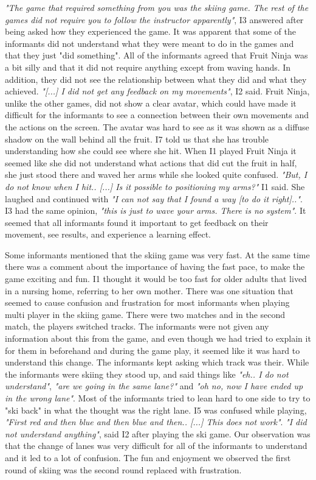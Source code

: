 \emph{"The game that required something from you was the skiing game. The rest of the games did not require you to follow the instructor apparently"}, I3 answered after being asked how they experienced the game. It was apparent that some of the informants did not understand what they were meant to do in the games and that they just "did something". All of the informants agreed that Fruit Ninja was a bit silly and that it did not require anything except from waving hands. In addition, they did not see the relationship between what they did and what they achieved. \emph{"[...] I did not get any feedback on my movements"}, I2 said. Fruit Ninja, unlike the other games, did not show a clear avatar, which could have made it difficult for the informants to see a connection between their own movements and the actions on the screen. The avatar was hard to see as it was shown as a diffuse shadow on the wall behind all the fruit. I7 told us that she has trouble understanding how she could see where she hit. When I1 played Fruit Ninja it seemed like she did not understand what actions that did cut the fruit in half, she just stood there and waved her arms while she looked quite confused. \emph{"But, I do not know when I hit.. [...] Is it possible to positioning my arms?"} I1 said. She laughed and continued with \emph{"I can not say that I found a way [to do it right].."}. I3 had the same opinion, \emph{"this is just to wave your arms. There is no system"}. It seemed that all informants found it important to get feedback on their movement, see results, and experience a learning effect. 

Some informants mentioned that the skiing game was very fast. At the same time there was a comment about the importance of having the fast pace, to make the game exciting and fun. I1 thought it would be too fast for older adults that lived in a nursing home, referring to her own mother. There was one situation that seemed to cause confusion and frustration for most informants when playing multi player in the skiing game. There were two matches and in the second match, the players switched tracks. The informants were not given any information about this from the game, and even though we had tried to explain it for them in beforehand and during the game play, it seemed like it was hard to understand this change. The informants kept asking which track was their. While the informants were skiing they stood up, and said things like \emph{"eh.. I do not understand"}, \emph{"are we going in the same lane?"} and \emph{"oh no, now I have ended up in the wrong lane"}. Most of the informants tried to lean hard to one side to try to "ski back" in what the thought was the right lane. I5 was confused while playing, \emph{"First red and then blue and then blue and then.. [...] This does not work"}. \emph{"I did not understand anything"}, said I2 after playing the ski game. Our observation was that the change of lanes was very difficult for all of the informants to understand and it led to a lot of confusion. The fun and enjoyment we observed the first round of skiing was the second round replaced with frustration. 

